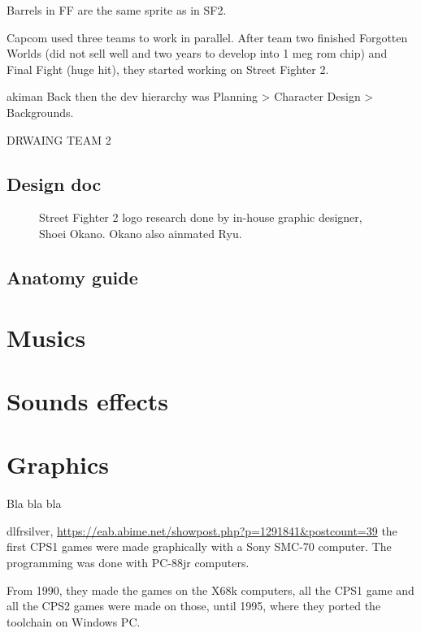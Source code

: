 Barrels in FF are the same sprite as in SF2.


Capcom used three teams to work in parallel. After team two finished Forgotten Worlds (did not sell well\cite{ar20160331} and two years to develop into 1 meg rom chip) and Final Fight (huge hit), they started working on Street Fighter 2.

\begin{q}{akiman\cite{ar20160331}}
Back then the dev hierarchy was Planning > Character Design > Backgrounds.
\end{q}

DRWAING TEAM 2



\subsection{Design doc}

\begin{figure}[H]
\caption*{Street Fighter 2 logo research done by in-house graphic designer, Shoei Okano. Okano also ainmated Ryu.}
\end{figure}











\subsection{Anatomy guide}
\section{Musics}
\section{Sounds effects}




\section{Graphics}
Bla bla bla

\begin{q}{dlfrsilver, \url{https://eab.abime.net/showpost.php?p=1291841&postcount=39}}
the first CPS1 games were made graphically with a Sony SMC-70 computer.
The programming was done with PC-88jr computers.

From 1990, they made the games on the X68k computers, all the CPS1 game and all the CPS2 games were made on those, until 1995, where they ported the toolchain on Windows PC.
\end{q}